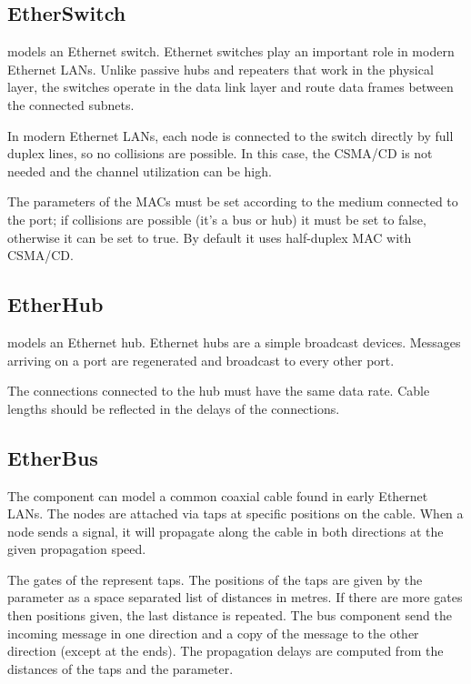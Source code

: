 \subsection{EtherSwitch}
\label{sec:ethernet:etherswitch}

 models an Ethernet switch. Ethernet switches play an
important role in modern Ethernet LANs. Unlike passive hubs and repeaters that
work in the physical layer, the switches operate in the data link layer and
route data frames between the connected subnets.

In modern Ethernet LANs, each node is connected to the switch directly by full
duplex lines, so no collisions are possible. In this case, the CSMA/CD is not
needed and the channel utilization can be high.

The  parameters of the MACs must be set according to the
medium connected to the port; if collisions are possible (it's a bus or hub)
it must be set to false, otherwise it can be set to true.
By default it uses half-duplex MAC with CSMA/CD.

%
%

\subsection{EtherHub}
\label{sec:ethernet:etherhub}

 models an Ethernet hub. Ethernet hubs are a simple broadcast
devices. Messages arriving on a port are regenerated and broadcast to every
other port.

The connections connected to the hub must have the same data rate.
Cable lengths should be reflected in the delays of the connections.


\subsection{EtherBus}
\label{sec:ethernet:etherbus}

The  component can model a common coaxial cable
found in early Ethernet LANs. The nodes are attached via taps at specific
positions on the cable. When a node sends a signal, it will propagate
along the cable in both directions at the given propagation speed.

The gates of the  represent taps. The positions
of the taps are given by the  parameter as a
space separated list of distances in metres. If there are more
gates then positions given, the last distance is repeated.
The bus component send the incoming message in one direction and
a copy of the message to the other direction (except at the ends).
The propagation delays are computed from the distances of the taps
and the  parameter.


